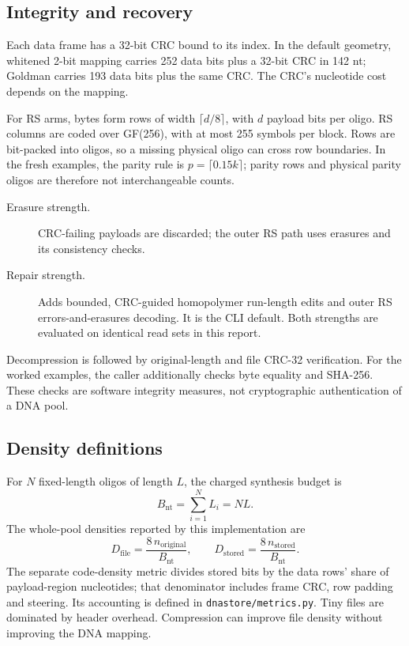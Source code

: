 \documentclass[11pt,a4paper]{article}
\begin{document}
\subsection*{Integrity and recovery}
Each data frame has a 32-bit CRC bound to its index. In the default geometry, whitened
2-bit mapping carries 252 data bits plus a 32-bit CRC in 142 nt; Goldman carries 193
data bits plus the same CRC. The CRC's nucleotide cost depends on the mapping.

For RS arms, bytes form rows of width $\lceil d/8\rceil$, with $d$ payload bits per
oligo. RS columns are coded over GF(256), with at most 255 symbols per block. Rows are
bit-packed into oligos, so a missing physical oligo can cross row boundaries. In the
fresh examples, the parity rule is $p=\lceil0.15k\rceil$; parity rows and physical parity
oligos are therefore not interchangeable counts.

\begin{description}
\item[Erasure strength.] CRC-failing payloads are discarded; the outer RS path uses
  erasures and its consistency checks.
\item[Repair strength.] Adds bounded, CRC-guided homopolymer run-length edits and
  outer RS errors-and-erasures decoding. It is the CLI default. Both strengths are
  evaluated on identical read sets in this report.
\end{description}
Decompression is followed by original-length and file CRC-32 verification. For the
worked examples, the caller additionally checks byte equality and SHA-256. These checks
are software integrity measures, not cryptographic authentication of a DNA pool.

\subsection*{Density definitions}
For $N$ fixed-length oligos of length $L$, the charged synthesis budget is
\[
B_{\mathrm{nt}}=\sum_{i=1}^{N} L_i=NL.
\]
The whole-pool densities reported by this implementation are
\[
D_{\mathrm{file}}=\frac{8\,n_{\mathrm{original}}}{B_{\mathrm{nt}}},\qquad
D_{\mathrm{stored}}=\frac{8\,n_{\mathrm{stored}}}{B_{\mathrm{nt}}}.
\]
The separate code-density metric divides stored bits by the data rows' share of
payload-region nucleotides; that denominator includes frame CRC, row padding and steering.
Its accounting is defined in \texttt{dnastore/metrics.py}. Tiny files are dominated by
header overhead. Compression can improve file density without improving the DNA mapping.
\end{document}
